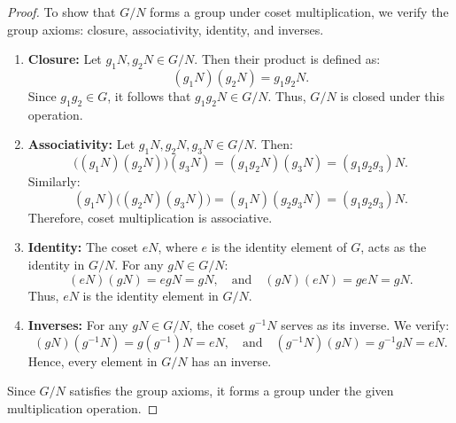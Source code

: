 \begin{proof}
    To show that \( G/N \) forms a group under coset multiplication, we verify the group axioms: closure, associativity, identity, and inverses.
    
    \begin{enumerate}
        \item \textbf{Closure:}  
        Let \( g_1N, g_2N \in G/N \). Then their product is defined as:
        \[
        (g_1N)(g_2N) = g_1g_2N.
        \]
        Since \( g_1g_2 \in G \), it follows that \( g_1g_2N \in G/N \). Thus, \( G/N \) is closed under this operation.
    
        \item \textbf{Associativity:}  
        Let \( g_1N, g_2N, g_3N \in G/N \). Then:
        \[
        \big((g_1N)(g_2N)\big)(g_3N) = (g_1g_2N)(g_3N) = (g_1g_2g_3)N.
        \]
        Similarly:
        \[
        (g_1N)\big((g_2N)(g_3N)\big) = (g_1N)(g_2g_3N) = (g_1g_2g_3)N.
        \]
        Therefore, coset multiplication is associative.
    
        \item \textbf{Identity:}  
        The coset \( eN \), where \( e \) is the identity element of \( G \), acts as the identity in \( G/N \). For any \( gN \in G/N \):
        \[
        (eN)(gN) = egN = gN, \quad \text{and} \quad (gN)(eN) = geN = gN.
        \]
        Thus, \( eN \) is the identity element in \( G/N \).
    
        \item \textbf{Inverses:}  
        For any \( gN \in G/N \), the coset \( g^{-1}N \) serves as its inverse. We verify:
        \[
        (gN)(g^{-1}N) = g(g^{-1})N = eN, \quad \text{and} \quad (g^{-1}N)(gN) = g^{-1}gN = eN.
        \]
        Hence, every element in \( G/N \) has an inverse.
    \end{enumerate}
    
    Since \( G/N \) satisfies the group axioms, it forms a group under the given multiplication operation.
    \end{proof}